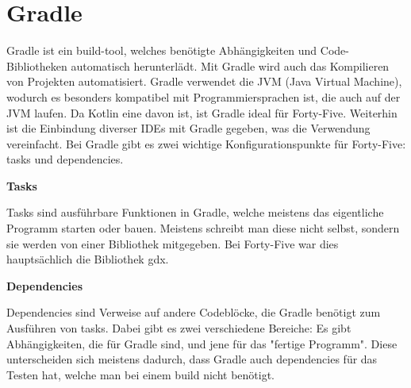 
\renewcommand{\kapitelautor}{Autor: Felix Zwickelstorfer}
\section{Gradle}\label{sec:gradle}

\renewcommand{\kapitelautor}{Autor: Felix Zwickelstorfer}

Gradle ist ein build-tool, welches benötigte Abhängigkeiten und Code-Bibliotheken automatisch herunterlädt.
Mit Gradle wird auch das Kompilieren von Projekten automatisiert.
Gradle verwendet die JVM (Java Virtual Machine), wodurch es besonders kompatibel mit Programmiersprachen ist, die auch auf der JVM laufen.
Da Kotlin eine davon ist, ist Gradle ideal für Forty-Five.
Weiterhin ist die Einbindung diverser IDEs mit Gradle gegeben, was die Verwendung vereinfacht.
Bei Gradle gibt es zwei wichtige Konfigurationspunkte für Forty-Five: tasks und dependencies.

\textbf{Tasks}

Tasks sind ausführbare Funktionen in Gradle, welche meistens das eigentliche Programm starten oder bauen.
Meistens schreibt man diese nicht selbst, sondern sie werden von einer Bibliothek mitgegeben.
Bei Forty-Five war dies hauptsächlich die Bibliothek gdx.

\textbf{Dependencies}

Dependencies sind Verweise auf andere Codeblöcke, die Gradle benötigt zum Ausführen von tasks.
Dabei gibt es zwei verschiedene Bereiche: Es gibt Abhängigkeiten, die für Gradle sind, und jene für das "fertige Programm".
Diese unterscheiden sich meistens dadurch, dass Gradle auch dependencies für das Testen hat, welche man bei einem build nicht benötigt.
